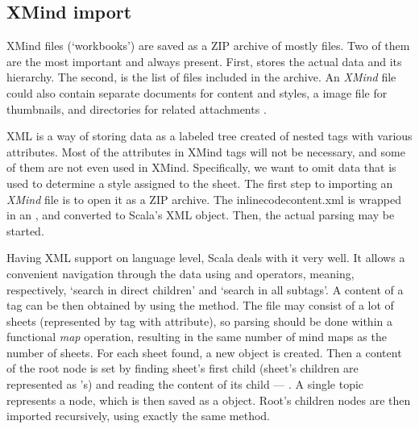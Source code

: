 %
%
%
%
%

\subsection{XMind import}
\label{subsec:xmind-exchange}

XMind files (`workbooks') are saved as a ZIP archive of mostly  files. Two of them are the most important and always present. First,  stores the actual data and its hierarchy. The second,  is the list of files included in the archive. An {\em XMind} file could also contain separate  documents for content and styles, a  image file for thumbnails, and directories for related attachments \cite{XMind:2009:Format}.

XML is a way of storing data as a labeled tree created of nested tags with various attributes. Most of the attributes in  XMind tags will not be necessary, and some of them are not even used in XMind. Specifically, we want to omit data that is used to determine a style assigned to the sheet. The first step to importing an {\em XMind} file is to open it as a ZIP archive. The inlinecode{content.xml} is wrapped in an , and converted to Scala's XML object. Then, the actual parsing may be started.

Having XML support on language level, Scala deals with it very well. It allows a convenient navigation through the data using \inlinecode{\textbackslash} and \inlinecode{\textbackslash\textbackslash} operators, meaning, respectively, `search in direct children' and `search in all subtags'. A content of a tag can be then obtained by using the  method. The  file may consist of a lot of sheets (represented by  tag with  attribute), so parsing should be done within a functional \emph{map} operation, resulting in the same number of mind maps as the number of sheets. For each sheet found, a new  object is created. Then a content of the root node is set by finding sheet's first child (sheet's children are represented as 's) and reading the content of its child --- . A single topic represents a node, which is then saved as a  object. Root's children nodes are then imported recursively, using exactly the same method.
